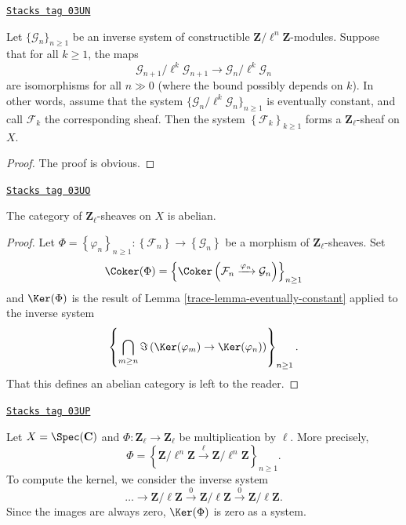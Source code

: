 \begin{lemma}
\label{trace-lemma-eventually-constant}
\href{https://stacks.math.columbia.edu/tag/03UN}{\texttt{Stacks tag 03UN}}

Let $\{\mathcal{G}_n\}_{n\geq 1}$ be an inverse system of constructible
$\mathbf{Z}/\ell^n\mathbf{Z}$-modules.
Suppose that for all $k\geq 1$, the maps
$$
\mathcal{G}_{n+1}/\ell^k \mathcal{G}_{n+1}\to \mathcal{G}_n /\ell^k
\mathcal{G}_n
$$
are isomorphisms for all $n\gg 0$ (where the bound possibly depends on $k$).
In other words, assume that the system
$\{\mathcal{G}_n/\ell^k\mathcal{G}_n\}_{n\geq 1}$
is eventually constant, and call $\mathcal{F}_k$ the corresponding sheaf.
Then the system $\left\{\mathcal{F}_k\right\}_{k\geq 1}$ forms a
$\mathbf{Z}_\ell$-sheaf on $X$.
\end{lemma}

\begin{proof}
The proof is obvious.
\end{proof}

\begin{lemma}
\label{trace-lemma-l-adic-abelian}
\href{https://stacks.math.columbia.edu/tag/03UO}{\texttt{Stacks tag 03UO}}

The category of $\mathbf{Z}_\ell$-sheaves on $X$ is abelian.
\end{lemma}

\begin{proof}

Let
$\Phi = \left\{\varphi_n\right\}_{n\geq 1} :
\left\{\mathcal{F}_n\right\}
\to
\left\{\mathcal{G}_n\right\}$
be a morphism of $\mathbf{Z}_\ell$-sheaves. Set
$$
\Coker(\Phi) =
\left\{
\Coker\left(\mathcal{F}_n \xrightarrow{\varphi_n} \mathcal{G}_n\right)
\right\}_{n\geq 1}
$$
and $\Ker(\Phi)$ is the result of
Lemma \ref{trace-lemma-eventually-constant}
applied to the inverse system
$$
\left\{
\bigcap_{m\geq n}
\Im\left(\Ker(\varphi_m) \to \Ker(\varphi_n)\right)
\right\}_{n \geq 1}.
$$
That this defines an abelian category is left to the reader.
\end{proof}

\begin{example}[Kernel]
\label{trace-example-kernel}
\href{https://stacks.math.columbia.edu/tag/03UP}{\texttt{Stacks tag 03UP}}

Let $X=\Spec(\mathbf{C})$ and $\Phi : \mathbf{Z}_\ell\to \mathbf{Z}_\ell$
be multiplication by $\ell$. More precisely,
$$
\Phi = \left\{ \mathbf{Z}/\ell^n\mathbf{Z} \xrightarrow{\ell}
\mathbf{Z}/\ell^n\mathbf{Z}\right\}_{n \geq 1}.
$$
To compute the kernel, we consider the inverse system
$$
\ldots\to \mathbf{Z}/\ell\mathbf{Z}\xrightarrow{0}
\mathbf{Z}/\ell\mathbf{Z}\xrightarrow{0}\mathbf{Z}/\ell\mathbf{Z}.
$$
Since the images are always zero, $\Ker(\Phi)$ is zero as a system.
\end{example}

